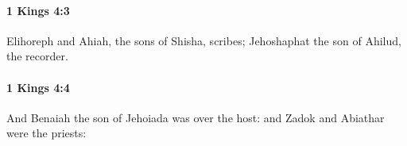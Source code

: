 		\paragraph{1 Kings 4:3} %
			\label{1KINGS-4-3}

			Elihoreph and Ahiah, the sons of Shisha, scribes; Jehoshaphat the son of Ahilud, the recorder.


		\paragraph{1 Kings 4:4} %
			\label{1KINGS-4-4}

			And Benaiah the son of Jehoiada was over the host: and Zadok and Abiathar were the priests:


